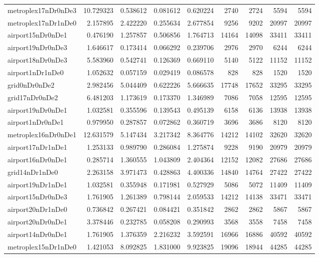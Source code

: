 \begin{longtable}{|l|r|r|r|r|r|r|r|r|}
metroplex17nDr0nDe3 & 10.729323 & 0.538612 & 0.081612 & 0.620224 & 2740 & 2724 & 5594 & 5594 \\
metroplex17nDr1nDe0 & 2.157895 & 2.422220 & 0.255634 & 2.677854 & 9256 & 9202 & 20997 & 20997 \\
airport15nDr0nDe1 & 0.476190 & 1.257857 & 0.506856 & 1.764713 & 14164 & 14098 & 33411 & 33411 \\
airport19nDr0nDe3 & 1.646617 & 0.173414 & 0.066292 & 0.239706 & 2976 & 2970 & 6244 & 6244 \\
airport18nDr0nDe3 & 5.583960 & 0.542741 & 0.126369 & 0.669110 & 5140 & 5122 & 11152 & 11152 \\
airport1nDr1nDe0 & 1.052632 & 0.057159 & 0.029419 & 0.086578 & 828 & 828 & 1520 & 1520 \\
grid0nDr0nDe2 & 2.982456 & 5.044409 & 0.622226 & 5.666635 & 17748 & 17652 & 33295 & 33295 \\
grid17nDr0nDe2 & 6.481203 & 1.173619 & 0.173370 & 1.346989 & 7086 & 7058 & 12595 & 12595 \\
airport19nDr0nDe1 & 1.032581 & 0.355596 & 0.139543 & 0.495139 & 6158 & 6136 & 13938 & 13938 \\
airport1nDr0nDe1 & 0.979950 & 0.287857 & 0.072862 & 0.360719 & 3696 & 3686 & 8120 & 8120 \\
metroplex16nDr0nDe1 & 12.631579 & 5.147434 & 3.217342 & 8.364776 & 14212 & 14102 & 32620 & 32620 \\
airport17nDr1nDe1 & 1.253133 & 0.989790 & 0.286084 & 1.275874 & 9228 & 9190 & 20979 & 20979 \\
airport16nDr0nDe1 & 0.285714 & 1.360555 & 1.043809 & 2.404364 & 12152 & 12082 & 27686 & 27686 \\
grid14nDr1nDe0 & 2.263158 & 3.971473 & 0.428863 & 4.400336 & 14840 & 14764 & 27422 & 27422 \\
airport19nDr1nDe1 & 1.032581 & 0.355948 & 0.171981 & 0.527929 & 5086 & 5072 & 11409 & 11409 \\
airport15nDr0nDe3 & 1.761905 & 1.261389 & 0.798144 & 2.059533 & 14212 & 14138 & 33471 & 33471 \\
airport20nDr1nDe0 & 0.736842 & 0.267421 & 0.084421 & 0.351842 & 2862 & 2862 & 5867 & 5867 \\
airport20nDr0nDe1 & 3.378446 & 0.232785 & 0.058208 & 0.290993 & 3568 & 3558 & 7458 & 7458 \\
airport14nDr0nDe1 & 1.761905 & 1.376359 & 2.216232 & 3.592591 & 16966 & 16886 & 40592 & 40592 \\
metroplex15nDr1nDe0 & 1.421053 & 8.092825 & 1.831000 & 9.923825 & 19096 & 18944 & 44285 & 44285 \\

\end{longtable}
